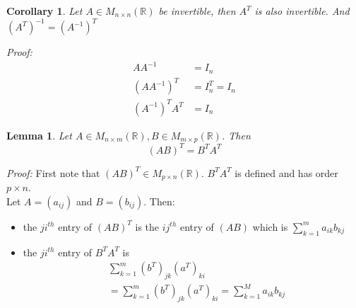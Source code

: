 \documentclass{report}
\newtheorem*{corollary}{Corollary}
\newtheorem{lemma}[theorem]{Lemma}
\theoremstyle{remark}
\theoremstyle{definition}
\theoremstyle{definition}
\theoremstyle{theorem}
\begin{document}
\begin{corollary}
Let $A \in M_{n \times n}(\mathbb{R})$ be invertible, then $A^T$ is also invertible. And $(A^T)^{-1} = (A^{-1})^T$
\end{corollary}
\emph{Proof:} \begin{align*}
AA^{-1} &= I_n\\
(AA^{-1})^T&=I_n^T=I_n\\
(A^{-1})^TA^T&=I_n
\end{align*}
\begin{lemma}
Let $A \in M_{n \times m}(\mathbb{R}), B \in M_{m \times p}(\mathbb{R})$. Then
\[ (AB)^T = B^TA^T \]
\end{lemma}
\emph{Proof:} First note that $(AB)^T \in M_{p \times n}(\mathbb{R})$. $B^TA^T$ is defined and has order $p \times n$.\\
Let $A=(a_{ij})$ and $B = (b_{ij})$. Then:
\begin{itemize}
    \item the $ji^{th}$ entry of $(AB)^T$ is the $ij^{th}$ entry of $(AB)$ which is $\sum^m_{k = 1}a_{ik}b_{kj}$
    \item the $ji^{th}$ entry of $B^TA^T$ is 
    \begin{align*}
        &\sum^m_{k=1}(b^T)_{jk}(a^T)_{ki}\\
        &= \sum^m_{k=1} (b^T)_{jk}(a^T)_{ki} = \sum^M_{k=1}a_{ik}b_{kj}
    \end{align*}
\end{itemize}
\end{document}
